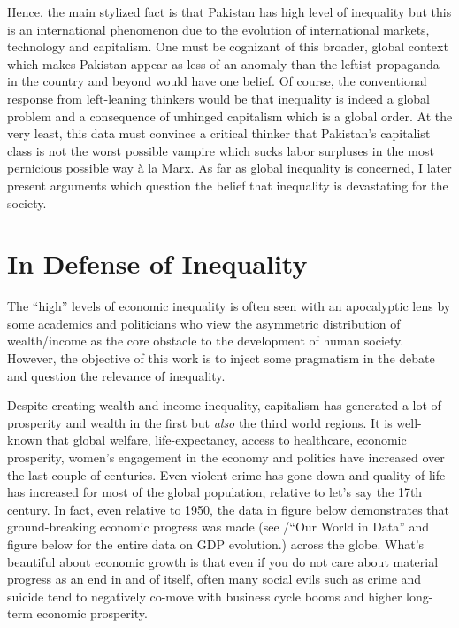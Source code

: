 \documentclass[12pt]{article}
\newcommand{\1}{\mathbbm 1}
\begin{document}
Hence, the main stylized fact is that Pakistan has high level of inequality but this is an international phenomenon due to the evolution of international markets, technology and capitalism. One must be cognizant of this broader, global context which makes Pakistan appear as less of an anomaly than the leftist propaganda in the country and beyond would have one belief. Of course, the conventional response from left-leaning thinkers would be that inequality is indeed a global problem and a consequence of unhinged capitalism which is a global order. At the very least, this data must convince a critical thinker that Pakistan's capitalist class is not the worst possible vampire which sucks labor surpluses in the most pernicious possible way \`a la Marx. As far as global inequality is concerned, I later present arguments which question the belief that inequality is devastating for the society.
		
		
		
		
		
		
		
		
		

		

			
		
		
		\section{In Defense of Inequality}
		
		
		The ``high'' levels of economic inequality is often seen with an apocalyptic lens by some academics and politicians who view the asymmetric distribution of wealth/income as the core obstacle to the development of human society. However, the objective of this work is to inject some pragmatism in the debate and question the relevance of inequality.
		
		Despite creating wealth and income inequality, capitalism has generated a lot of prosperity and wealth in the first but \textit{also} the third world regions. It is well-known that global welfare, life-expectancy, access to healthcare, economic prosperity, women's engagement in the economy and politics have increased over the last couple of centuries. Even violent crime has gone down and quality of life has increased for most of the global population, relative to let's say the 17th century. In fact, even relative to 1950, the data in figure below demonstrates that ground-breaking economic progress was made (see \cite{owid-economic-growth}/``Our World in Data'' and figure below  for the entire data on GDP evolution.) across the globe. What's beautiful about economic growth is that even if you do not care about material progress as an end in and of itself, often many social evils such as crime and suicide tend to negatively co-move with business cycle booms and higher long-term economic prosperity.
		
\end{document}

